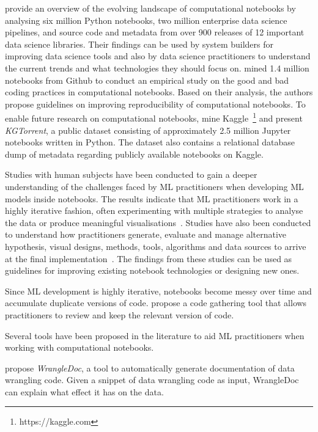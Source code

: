 \documentclass[acmsmall,screen,review,anonymous]{acmart}
\begin{document}
\citeauthor{psallidas2019data} provide an overview of the evolving landscape of computational notebooks by analysing six million Python notebooks, two million enterprise data science pipelines, and source code and metadata from over 900 releases of 12 important data science libraries. Their findings can be used by system builders for improving data science tools and also by data science practitioners to understand the current trends and what technologies they should focus on. \citeauthor{pimentel2019large} mined 1.4 million notebooks from Github to conduct an empirical study on the good and bad coding practices in computational notebooks. Based on their analysis, the authors propose guidelines on improving reproducibility of computational notebooks. To enable future research on computational notebooks, \citeauthor{quaranta2021kgtorrent} mine Kaggle~\footnote{https://kaggle.com} and present \textit{KGTorrent}, a public dataset consisting of approximately 2.5 million Jupyter notebooks written in Python. The dataset also contains a relational database dump of metadata regarding publicly available notebooks on Kaggle.

Studies with human subjects have been conducted to gain a deeper understanding of the challenges faced by ML practitioners when developing ML models inside notebooks. The results indicate that ML practitioners work in a highly iterative fashion, often experimenting with multiple strategies to analyse the data or produce meaningful visualisations~\cite{kandel2012enterprise, kery2018story, liu2019understanding, chattopadhyay2020wrong}. Studies have also been conducted to understand how practitioners generate, evaluate and manage alternative hypothesis, visual designs, methods, tools, algorithms and data sources to arrive at the final implementation~\cite{liu2019understanding,kandel2012enterprise}. The findings from these studies can be used as guidelines for improving existing notebook technologies or designing new ones.

Since ML development is highly iterative, notebooks become messy over time and accumulate duplicate versions of code. \citeauthor{head2019managing} propose a code gathering tool that allows practitioners to review and keep the relevant version of code.

Several tools have been proposed in the literature to aid ML practitioners when working with computational notebooks.

\citeauthor{yang2021subtle} propose \textit{WrangleDoc}, a tool to automatically generate documentation of data wrangling code. Given a snippet of data wrangling code as input, WrangleDoc can explain what effect it has on the data.
\end{document}
